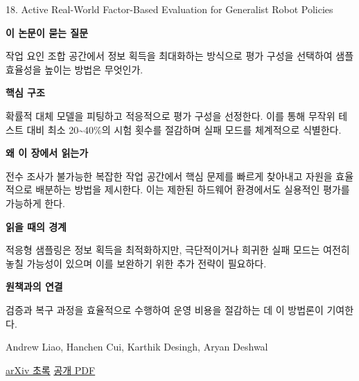 \documentclass[11pt,openany]{book}
\begin{document}
\begin{termcard}{18. Active Real-World Factor-Based Evaluation for Generalist Robot Policies}

\par

\medskip

{\sffamily\bfseries\color{deepblue} 이 논문이 묻는 질문}\par

작업 요인 조합 공간에서 정보 획득을 최대화하는 방식으로 평가 구성을 선택하여 샘플 효율성을 높이는 방법은 무엇인가.

\smallskip

{\sffamily\bfseries\color{deepblue} 핵심 구조}\par

확률적 대체 모델을 피팅하고 적응적으로 평가 구성을 선정한다. 이를 통해 무작위 테스트 대비 최소 20\textasciitilde{}40\%의 시험 횟수를 절감하며 실패 모드를 체계적으로 식별한다.

\smallskip

{\sffamily\bfseries\color{deepblue} 왜 이 장에서 읽는가}\par

전수 조사가 불가능한 복잡한 작업 공간에서 핵심 문제를 빠르게 찾아내고 자원을 효율적으로 배분하는 방법을 제시한다. 이는 제한된 하드웨어 환경에서도 실용적인 평가를 가능하게 한다.

\smallskip

{\sffamily\bfseries\color{coral} 읽을 때의 경계}\par

적응형 샘플링은 정보 획득을 최적화하지만, 극단적이거나 희귀한 실패 모드는 여전히 놓칠 가능성이 있으며 이를 보완하기 위한 추가 전략이 필요하다.

\smallskip

{\sffamily\bfseries\color{teal} 원책과의 연결}\par

검증과 복구 과정을 효율적으로 수행하여 운영 비용을 절감하는 데 이 방법론이 기여한다.

\medskip

{\footnotesize\color{muted} Andrew Liao, Hanchen Cui, Karthik Desingh, Aryan Deshwal\par

\href{https://arxiv.org/abs/2607.14439}{arXiv 초록} \quad \href{https://arxiv.org/pdf/2607.14439}{공개 PDF}\par}

\end{termcard}
\end{document}
